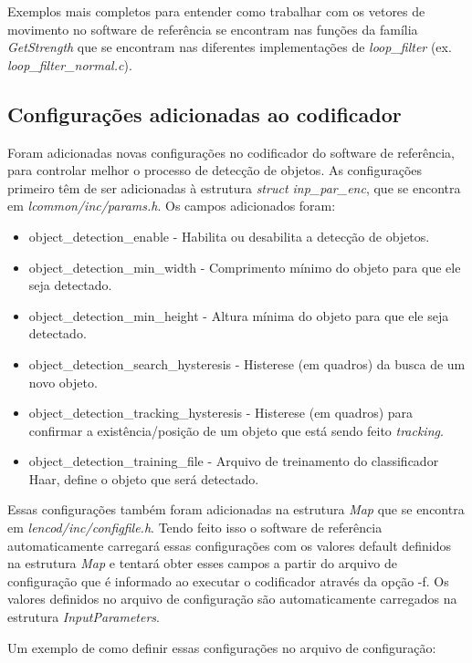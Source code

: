 Exemplos mais completos para entender como trabalhar com os vetores de movimento no software de referência se encontram nas funções da família \textit{GetStrength} que se encontram nas diferentes implementações de \textit{loop\_filter} (ex. \textit{loop\_filter\_normal.c}).


\subsection{ Configurações adicionadas ao codificador }


Foram adicionadas novas configurações no codificador do software de referência, para controlar melhor o processo de detecção de objetos. As configurações primeiro têm de ser adicionadas à estrutura \textit{struct inp\_par\_enc}, que se encontra em \textit{lcommon/inc/params.h}. Os campos adicionados foram:

\begin{itemize}
	\item object\_detection\_enable - Habilita ou desabilita a detecção de objetos.
        \item object\_detection\_min\_width - Comprimento mínimo do objeto para que ele seja detectado.
        \item object\_detection\_min\_height - Altura mínima do objeto para que ele seja detectado.
        \item object\_detection\_search\_hysteresis - Histerese (em quadros) da busca de um novo objeto.
        \item object\_detection\_tracking\_hysteresis - Histerese (em quadros) para confirmar a existência/posição de um objeto que está sendo feito \textit{tracking}.
	\item object\_detection\_training\_file - Arquivo de treinamento do classificador Haar, define o objeto que será detectado.
\end{itemize}

Essas configurações também foram adicionadas na estrutura \textit{Map} que se encontra em \textit{lencod/inc/configfile.h}. Tendo feito isso o software de referência automaticamente carregará essas configurações com os valores default definidos na estrutura \textit{Map} e tentará obter esses campos a partir do arquivo de configuração que é informado ao executar o codificador através da opção -f. Os valores definidos no arquivo de configuração são automaticamente carregados na estrutura \textit{InputParameters}.

Um exemplo de como definir essas configurações no arquivo de configuração:

